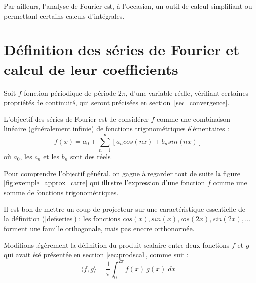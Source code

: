 Par ailleurs, l'analyse de Fourier est, à l'occasion, un outil de calcul simplifiant ou permettant certains calculs d'intégrales.


\section{Définition des séries de Fourier et calcul de leur coefficients}

Soit
 $f$ fonction périodique de période $2\pi$, d'une variable réelle, vérifiant certaines propriétés de continuité, qui seront précisées en section~\ref{sec_convergence}.



\begin{boxedminipage}{14.5cm}
L'objectif des séries de Fourier est de considérer $f$ comme une
combinaison linéaire (généralement infinie) de fonctions trigonométriques élémentaires :
\begin{equation}
f(x)=a_0+\sum_{n=1}^{\infty}[a_n cos(nx) + b_n sin(nx)]
\label{defseries}
\end{equation}
où $a_0$, les $a_n$ et les $b_n$ sont des réels.
\end{boxedminipage}

Pour comprendre l'objectif général, on gagne à regarder tout de suite la figure \ref{fig:exemple_approx_carre} qui illustre l'expression d'une fonction $f$ comme une somme de fonctions trigonométriques.

Il est bon de mettre un coup de projecteur sur une caractéristique
essentielle de la définition (\ref{defseries}) : les fonctions
${cos(x), sin(x), cos(2x), sin(2x),...}$ forment une famille orthogonale, mais pas encore orthonormée.


Modifions légèrement la définition du produit scalaire entre deux fonctions $f$ et $g$ qui avait été présentée en section \ref{sec:prodscal}, comme suit :
\begin{equation}
\langle f, g \rangle  = \frac{1}{\pi}\int_0^{2\pi} f(x)\; g(x)\; dx
\end{equation}

